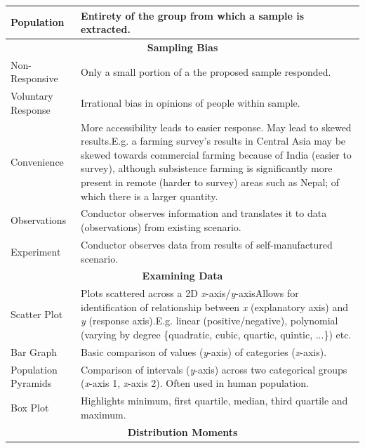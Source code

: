 \documentclass[11pt, english]{article}
\begin{document}
\begin{center}
\begin{longtable}{p{3cm}p{9cm}}
                Population & Entirety of the group from which a sample is extracted.\\
                \hline
                \multicolumn{2}{c}{\textbf{Sampling Bias}}\\
                \hline
		Non-Responsive & Only a small portion of a the proposed sample responded.\\
                Voluntary Response & Irrational bias in opinions of people within sample.\\
                Convenience & More accessibility leads to easier response. May lead to skewed results.\newline E.g. a farming survey’s results in Central Asia may be skewed towards commercial farming because of India (easier to survey), although subsistence farming is significantly more present in remote (harder to survey) areas such as Nepal; of which there is a larger quantity.\\
                Observations & Conductor observes information and translates it to data (observations) from existing scenario.\\
                Experiment & Conductor observes data from results of self-manufactured scenario.\\
                \hline
                \hline
                \multicolumn{2}{c}{\textbf{Examining Data}}\\
                \hline
                \hline
                Scatter Plot & Plots scattered across a 2D \textit{x}-axis/\textit{y}-axis\newline Allows for identification of relationship between \textit{x} (explanatory axis) and \textit{y} (response axis).\newline E.g. linear (positive/negative), polynomial (varying by degree \{quadratic, cubic, quartic, quintic, ...\}) etc.\\
                Bar Graph & Basic comparison of values (\textit{y}-axis) of categories (\textit{x}-axis).\\
                Population Pyramids & Comparison of intervals (\textit{y}-axis) across two categorical groups (\textit{x}-axis 1, \textit{x}-axis 2). Often used in human population.\\
                Box Plot & Highlights minimum, first quartile, median, third quartile and maximum.\\
                \hline
                \multicolumn{2}{c}{\textbf{Distribution Moments}}\\
                \hline

\end{longtable}
\end{center}
\end{document}
